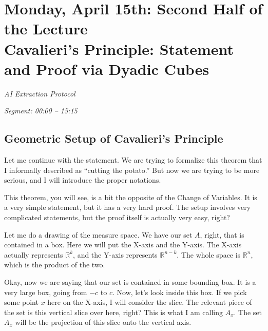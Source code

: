 \section{Monday, April 15th: Second Half of the Lecture \texorpdfstring{\\}{\&}
    Cavalieri's Principle: Statement and Proof via Dyadic Cubes}

\emph{AI Extraction Protocol}

\textit{Segment: 00:00 -- 15:15}



\subsection{Geometric Setup of Cavalieri's Principle}

\begin{spoken-clean}[00:00:08 - 00:02:20]
Let me continue with the statement. We are trying to formalize this theorem that I informally described as ``cutting the potato.'' But now we are trying to be more serious, and I will introduce the proper notations. 

This theorem, you will see, is a bit the opposite of the Change of Variables. It is a very simple statement, but it has a very hard proof. The setup involves very complicated statements, but the proof itself is actually very easy, right? 

Let me do a drawing of the measure space. We have our set $A$, right, that is contained in a box. Here we will put the X-axis and the Y-axis. The X-axis actually represents $\mathbb{R}^k$, and the Y-axis represents $\mathbb{R}^{n-k}$. The whole space is $\mathbb{R}^n$, which is the product of the two. 

Okay, now we are saying that our set is contained in some bounding box. It is a very large box, going from $-c$ to $c$. Now, let's look inside this box. If we pick some point $x$ here on the X-axis, I will consider the slice. The relevant piece of the set is this vertical slice over here, right? This is what I am calling $A_x$. The set $A_x$ will be the projection of this slice onto the vertical axis.
\end{spoken-clean}

